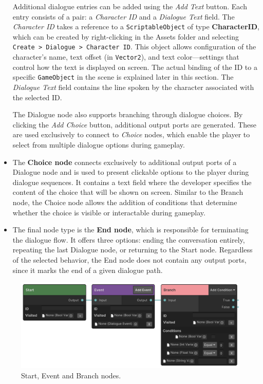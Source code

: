 \begin{itemize}
Additional dialogue entries can be added using the \textit{Add Text} button. Each entry consists of a pair: a \textit{Character ID} and a \textit{Dialogue Text} field. The \textit{Character ID} takes a reference to a \verb|ScriptableObject| of type \textbf{CharacterID}, which can be created by right-clicking in the Assets folder and selecting \verb|Create > Dialogue > Character ID|. This object allows configuration of the character's name, text offset (in \verb|Vector2|), and text color—settings that control how the text is displayed on screen. The actual binding of the ID to a specific \verb|GameObject| in the scene is explained later in this section. The \textit{Dialogue Text} field contains the line spoken by the character associated with the selected ID.

The Dialogue node also supports branching through dialogue choices. By clicking the \textit{Add Choice} button, additional output ports are generated. These are used exclusively to connect to \textit{Choice} nodes, which enable the player to select from multiple dialogue options during gameplay.

    \item The \textbf{Choice node} connects exclusively to additional output ports of a Dialogue node and is used to present clickable options to the player during dialogue sequences. It contains a text field where the developer specifies the content of the choice that will be shown on screen. Similar to the Branch node, the Choice node allows the addition of conditions that determine whether the choice is visible or interactable during gameplay. 
    \item  The final node type is the \textbf{End node}, which is responsible for terminating the dialogue flow. It offers three options: ending the conversation entirely, repeating the last Dialogue node, or returning to the Start node. Regardless of the selected behavior, the End node does not contain any output ports, since it marks the end of a given dialogue path. 
\end{itemize}
\begin{figure}[H]
\centering
\includegraphics[width=1\linewidth]{img/User doc/nodes1.png}
\caption{Start, Event and Branch nodes.}
\label{fig:Manual-Nodes1}
\end{figure}

